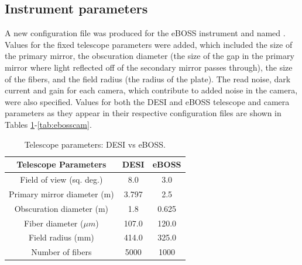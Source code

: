 
\subsection{Instrument parameters}

A new configuration file was produced for the eBOSS instrument and named . Values for the fixed telescope parameters were added, which included the size of the primary mirror, the obscuration diameter (the size of the gap in the primary mirror where light reflected off of the secondary mirror passes through), the size of the fibers, and the field radius (the radius of the plate). The read noise, dark current and gain for each camera, which contribute to added noise in the camera, were also specified. Values for both the DESI and eBOSS telescope and camera parameters as they appear in their respective configuration files are shown in Tables \ref{tab:comparison}-\ref{tab:ebosscam}.\\

\begin{table}[h]
\caption{Telescope parameters: DESI vs eBOSS.}
\label{tab:comparison}
\centering
\begin{tabular}{|c|c|c|}
  \hline
  Telescope Parameters & DESI & eBOSS\\
  \hline \hline
  Field of view (sq. deg.) & 8.0 & 3.0 \\
  \hline
  Primary mirror diameter (m) & 3.797 & 2.5 \\
  \hline
  Obscuration diameter (m) & 1.8 & 0.625 \\
  \hline
  Fiber diameter ($\mu m$) & 107.0 & 120.0 \\
  \hline
  Field radius (mm) & 414.0 & 325.0 \\
  \hline
  Number of fibers & 5000 & 1000 \\
  \hline
\end{tabular}
\end{table}


